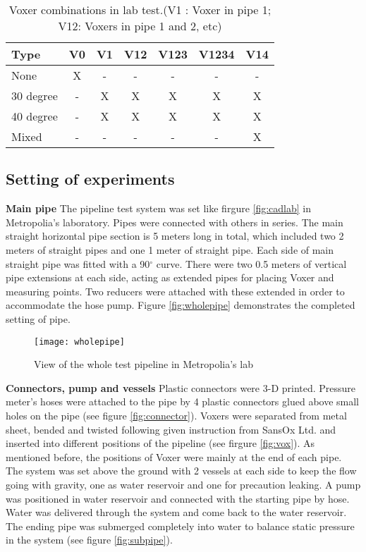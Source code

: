 \begin{table}[h]
  \centering
  \caption{Voxer combinations in lab test.\newline (V1 : Voxer in pipe 1; V12: Voxers in pipe 1 and 2, etc)}
  \begin{tabular}{l*{6}{c}}
Type             & V0 & V1 & V12 & V123 & V1234 & V14 \\
\hline
None & X & - & - & - & - & -   \\
30 degree           & - & X & X & X &  X & X  \\
40 degree           & - & X & X & X &  X & X   \\
Mixed     & - & - & - & - & - & X   \\
\end{tabular}
  \label{table:combi}
\end{table}

\subsection{Setting of experiments}

\textbf{Main pipe} \newline
The pipeline test system was set like firgure \vref{fig:cadlab} in Metropolia’s laboratory.  Pipes were connected with others in series. The main straight horizontal pipe section is 5 meters long in total, which included two 2 meters of straight pipes and one 1 meter of straight pipe. Each side of main straight pipe was fitted with a 90$^{\circ}$ curve. There were two 0.5 meters of vertical pipe extensions at each side, acting as extended pipes for placing Voxer and measuring points. Two reducers were attached with these extended in order to accommodate the hose pump. Figure \vref{fig:wholepipe} demonstrates the completed setting of pipe.

\begin{figure}[h]
  \centering
  \texttt{[image: wholepipe]}
  \caption{View of the whole test pipeline in Metropolia's lab }
  \label{fig:wholepipe}
\end{figure}

\textbf{Connectors, pump and vessels}\newline
Plastic connectors were 3-D printed. Pressure meter’s hoses were attached to the pipe by 4 plastic connectors glued above small holes on the pipe (see figure \vref{fig:connector}). Voxers were separated from metal sheet, bended and twisted following given instruction from SansOx Ltd. and inserted into different positions of the pipeline (see firgure \vref{fig:vox}). As mentioned before, the positions of Voxer were mainly at the end of each pipe. The system was set above the ground with 2 vessels at each side to keep the flow going with gravity, one as water reservoir and one for precaution leaking. A pump was positioned in water reservoir and connected with the starting pipe by hose. Water was delivered through the system and come back to the water reservoir. The ending pipe was submerged completely into water to balance static pressure in the system (see figure \ref{fig:subpipe}).

